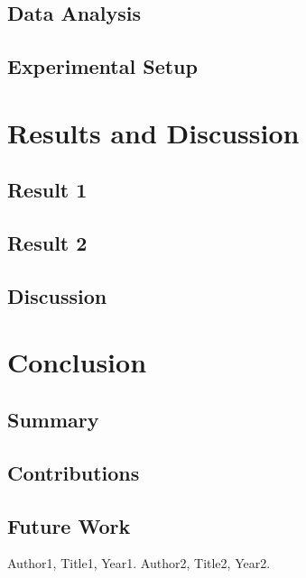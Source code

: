 \documentclass{report}
\begin{document}
\section{Data Analysis}
\section{Experimental Setup}

\chapter{Results and Discussion}
\section{Result 1}
\section{Result 2}
\section{Discussion}

\chapter{Conclusion}
\section{Summary}
\section{Contributions}
\section{Future Work}

\begin{thebibliography}{9}
 Author1, Title1, Year1.
 Author2, Title2, Year2.
\end{thebibliography}
\end{document}
